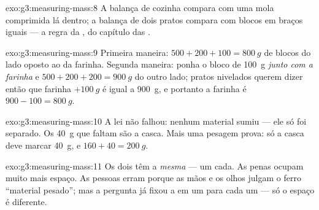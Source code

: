 \begin{solution}{exo:g3:measuring-mass:8}
A balança de cozinha compara com uma mola comprimida lá dentro; a
balança de dois pratos compara com blocos em braços iguais --- a
regra da , do capítulo das .
\end{solution}

\begin{solution}{exo:g3:measuring-mass:9}
Primeira maneira: $500 + 200 + 100 = \qty{800}{g}$ de blocos do lado
oposto ao da farinha. Segunda maneira: ponha o bloco de \qty{100}{g}
\emph{junto com a farinha} e $500 + 200 + 200 = \qty{900}{g}$ do
outro lado; pratos nivelados querem dizer então que farinha
$+ \qty{100}{g}$ é igual a \qty{900}{g}, e portanto a farinha é
$900 - 100 = \qty{800}{g}$.
\end{solution}

\begin{solution}{exo:g3:measuring-mass:10}
A lei não falhou: nenhum material sumiu --- ele só foi separado. Os
\qty{40}{g} que faltam são a casca. Mais uma pesagem prova: só a
casca deve marcar \qty{40}{g}, e $160 + 40 = \qty{200}{g}$.
\end{solution}

\begin{solution}{exo:g3:measuring-mass:11}
Os dois têm a \emph{mesma}  --- um  cada. As penas
ocupam muito mais espaço. As pessoas erram porque as mãos e os olhos
julgam o ferro ``material pesado''; mas a pergunta já fixou a 
em um  para cada um --- só o espaço é diferente.
\end{solution}
